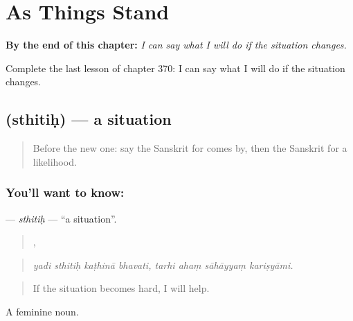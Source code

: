 
\chapter{As Things Stand}
\label{ch:sa-as-things-stand}

\begin{chapteropening}
\textbf{By the end of this chapter:} \emph{I can say what I will do if the situation changes.}

Complete the last lesson of chapter 370: I can say what I will do if the situation changes.
\end{chapteropening}

\section[\texorpdfstring{\sk{स्थितिः} (sthitiḥ)}{स्थितिः (sthitiḥ)}]{ (sthitiḥ) — a situation}

\label{lesson:SA-C370-sthitih}



\begin{quote}
Before the new one: say the Sanskrit for comes by, then the Sanskrit for a likelihood.
\end{quote}

\subsection*{You'll want to know: }
\textbf{} — \emph{sthitiḥ} — \textquotedblleft{}a situation\textquotedblright{}.

\begin{quote}
   ,    
\end{quote}

\begin{quote}
\emph{yadi sthitiḥ kaṭhinā bhavati, tarhi ahaṃ sāhāyyaṃ kariṣyāmi.}
\end{quote}

\begin{quote}
If the situation becomes hard, I will help.
\end{quote}

A feminine noun.

